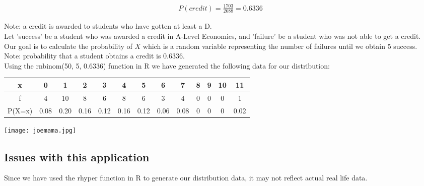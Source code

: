 \documentclass{article}
\begin{document}
\begin{gather*}
  P(credit) = \frac{1703}{2688} = 0.6336
\end{gather*}

Note: a credit is awarded to students who have gotten at least a D.\\


Let 'success' be a student who was awarded a credit in A-Level Economics,
and 'failure' be a student who was not able to get a credit. \\

Our goal is to calculate the probability of $X$ which is a random variable
representing the number of failures until we obtain 5 success. \\

Note: probability that a student obtains a credit is 0.6336.
\\



Using the rnbinom(50, 5, 0.6336) function in R we have generated the
following
data for our distribution:

\begin{center}
  \begin{tabular}{|c|c|c|c|c|c|c|c|c|c|c|c|c|}
    \hline
    x & 0 & 1 & 2 & 3 & 4 & 5 & 6 & 7 & 8 & 9 & 10 & 11 \\
    \hline
    f & 4 & 10 & 8 & 6 & 8 & 6 & 3 & 4 & 0 & 0 & 0 & 1\\
    \hline
    P(X=x) & 0.08 & 0.20 & 0.16 & 0.12 & 0.16 & 0.12 & 0.06 & 0.08 & 0 & 0 & 0 & 0.02 \\
    \hline
  \end{tabular}
\end{center}


\begin{center}
  \texttt{[image: joemama.jpg]}
\end{center}

\subsection{Issues with this application}
Since we have used the rhyper function in R to generate our distribution
data, it may not reflect actual real life data.
\end{document}
